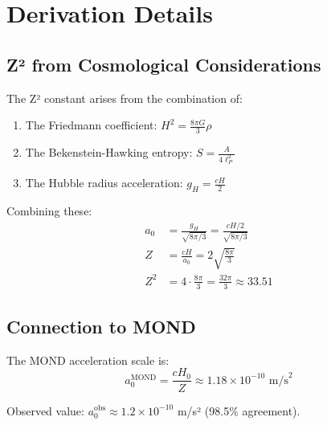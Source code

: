 \documentclass[11pt,a4paper]{article}
\theoremstyle{plain}
\theoremstyle{definition}
\theoremstyle{remark}
\newcommand{\Zsq}{Z^2}
\begin{document}
\appendix
\section{Derivation Details}

\subsection{Z² from Cosmological Considerations}

The Z² constant arises from the combination of:
\begin{enumerate}
    \item The Friedmann coefficient: $H^2 = \frac{8\pi G}{3}\rho$
    \item The Bekenstein-Hawking entropy: $S = \frac{A}{4\ell_P^2}$
    \item The Hubble radius acceleration: $g_H = \frac{cH}{2}$
\end{enumerate}

Combining these:
\begin{align}
    a_0 &= \frac{g_H}{\sqrt{8\pi/3}} = \frac{cH/2}{\sqrt{8\pi/3}} \\
    Z &= \frac{cH}{a_0} = 2\sqrt{\frac{8\pi}{3}} \\
    \Zsq &= 4 \cdot \frac{8\pi}{3} = \frac{32\pi}{3} \approx 33.51
\end{align}

\subsection{Connection to MOND}

The MOND acceleration scale is:
\begin{equation}
    a_0^{\text{MOND}} = \frac{cH_0}{Z} \approx 1.18 \times 10^{-10} \text{ m/s}^2
\end{equation}

Observed value: $a_0^{\text{obs}} \approx 1.2 \times 10^{-10}$ m/s² (98.5\% agreement).
\end{document}

